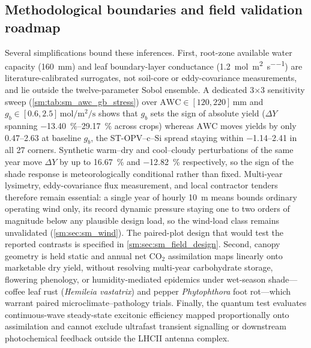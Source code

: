 \documentclass[preprint,12pt,a4paper]{elsarticle}
\begin{document}
\subsection{Methodological boundaries and field validation roadmap}
\label{sec:disc_limits}

Several simplifications bound these inferences. First, root-zone available water capacity (\qty{160}{\milli\meter}) and leaf boundary-layer conductance (\qty{1.2}{\mole\per\square\meter\per\second}) are literature-calibrated surrogates, not soil-core or eddy-covariance measurements, and lie outside the twelve-parameter Sobol ensemble. A dedicated \num{3}$\times$\num{3} sensitivity sweep (\cref{sm:tab:sm_awc_gb_stress}) over $\mathrm{AWC}\in[\num{120},\num{220}]\,\unit{\milli\meter}$ and $g_b\in[\num{0.6},\num{2.5}]\,\unit{\mole\per\square\meter\per\second}$ shows that $g_b$ sets the sign of absolute yield ($\Delta Y$ spanning \qtyrange{-13.40}{+29.17}{\percent} across crops) whereas $\mathrm{AWC}$ moves yields by only \qtyrange{0.47}{2.63}{\pp} at baseline $g_b$, the ST-OPV--c--Si spread staying within \qtyrange{-1.14}{+2.41}{\pp} in all \num{27} corners. Synthetic warm--dry and cool--cloudy perturbations of the same year move $\Delta Y$ by up to \qty{+16.67}{\percent} and \qty{-12.82}{\percent} respectively, so the sign of the shade response is meteorologically conditional rather than fixed. Multi-year lysimetry, eddy-covariance flux measurement, and local contractor tenders therefore remain essential: a single year of hourly \qty{10}{\meter} means bounds ordinary operating wind only, its record dynamic pressure staying one to two orders of magnitude below any plausible design load, so the wind-load class remains unvalidated (\cref{sm:sec:sm_wind}). The paired-plot design that would test the reported contrasts is specified in \cref{sm:sec:sm_field_design}. Second, canopy geometry is held static and annual net $\mathrm{CO_2}$ assimilation maps linearly onto marketable dry yield, without resolving multi-year carbohydrate storage, flowering phenology, or humidity-mediated epidemics under wet-season shade---coffee leaf rust (\textit{Hemileia vastatrix}) and pepper \textit{Phytophthora} foot rot---which warrant paired microclimate--pathology trials. Finally, the quantum test evaluates continuous-wave steady-state excitonic efficiency mapped proportionally onto assimilation and cannot exclude ultrafast transient signalling or downstream photochemical feedback outside the LHCII antenna complex.

\end{document}
